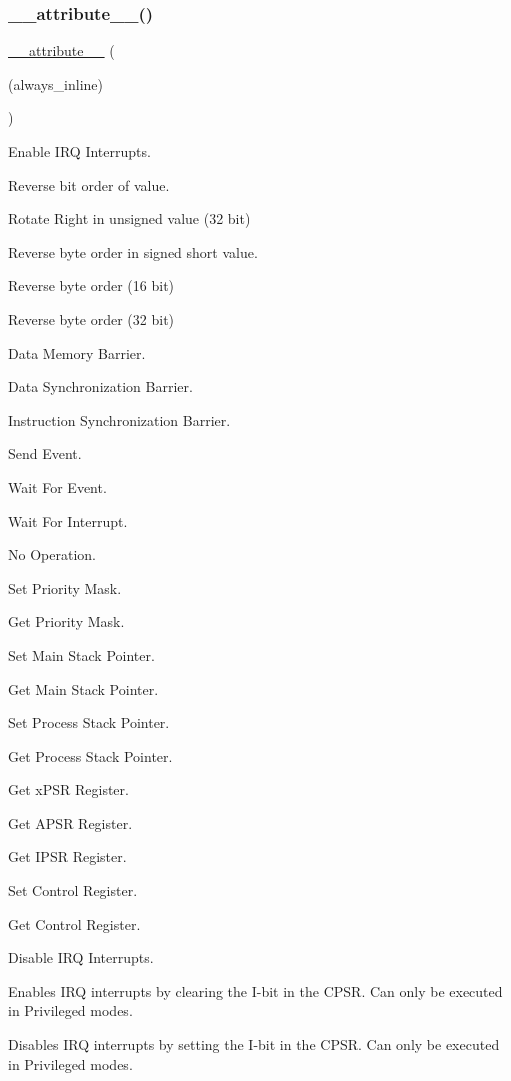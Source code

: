\subsubsection{\texorpdfstring{\_\_attribute\_\_()}{\_\_attribute\_\_()}}
{\footnotesize\ttfamily \mbox{\hyperlink{struct____attribute____}{\+\_\+\+\_\+attribute\+\_\+\+\_\+}} (\begin{DoxyParamCaption}\item[{(always\+\_\+inline)}]{ }\end{DoxyParamCaption})}



Enable I\+RQ Interrupts. 

Reverse bit order of value.

Rotate Right in unsigned value (32 bit)

Reverse byte order in signed short value.

Reverse byte order (16 bit)

Reverse byte order (32 bit)

Data Memory Barrier.

Data Synchronization Barrier.

Instruction Synchronization Barrier.

Send Event.

Wait For Event.

Wait For Interrupt.

No Operation.

Set Priority Mask.

Get Priority Mask.

Set Main Stack Pointer.

Get Main Stack Pointer.

Set Process Stack Pointer.

Get Process Stack Pointer.

Get x\+P\+SR Register.

Get A\+P\+SR Register.

Get I\+P\+SR Register.

Set Control Register.

Get Control Register.

Disable I\+RQ Interrupts.

Enables I\+RQ interrupts by clearing the I-\/bit in the C\+P\+SR. Can only be executed in Privileged modes.

Disables I\+RQ interrupts by setting the I-\/bit in the C\+P\+SR. Can only be executed in Privileged modes.

